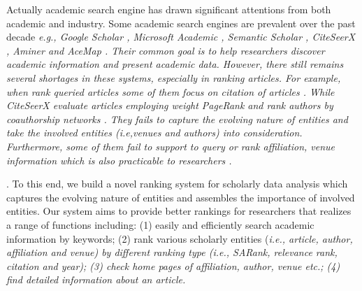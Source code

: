 

Actually academic search engine has drawn significant attentions from both academic and industry. Some academic search engines are prevalent over the past decade \itshape e.g., \upshape Google Scholar \cite{googlescholar}, Microsoft Academic \cite{sinha2015overview}, Semantic Scholar \cite{semantic}, CiteSeerX \cite{li2006citeseerx}, Aminer \cite{tang2008arnetminer} and AceMap \cite{tan2016acemap}. Their common goal is to help researchers discover academic information and present academic data. However, there still remains several shortages in these systems, especially in ranking articles. For example, when rank queried articles some of them focus on citation of articles \cite{tang2008arnetminer,tan2016acemap}. While CiteSeerX evaluate articles employing weight PageRank and rank authors by coauthorship networks \cite{sun2007popularity,fiala2013citeseer}. They fails to capture the evolving nature of entities and take the involved entities (\itshape i.e,\upshape venues and authors) into consideration. Furthermore, some of them fail to support to query or rank affiliation, venue information which is also practicable to researchers \cite{tan2016acemap, googlescholar}.


.
To this end, we build a novel ranking system for scholarly data analysis which captures the evolving nature of entities and assembles the importance of involved entities. Our system aims to provide better rankings for researchers that realizes a range of functions including: (1) easily and efficiently search academic information by keywords; (2) rank various scholarly entities (\itshape i.e., \upshape article, author, affiliation and venue) by different ranking type (\itshape i.e., \upshape SARank, relevance rank, citation and year); (3) check home pages of affiliation, author, venue  \itshape etc.\upshape ; (4) find detailed information about an article.

